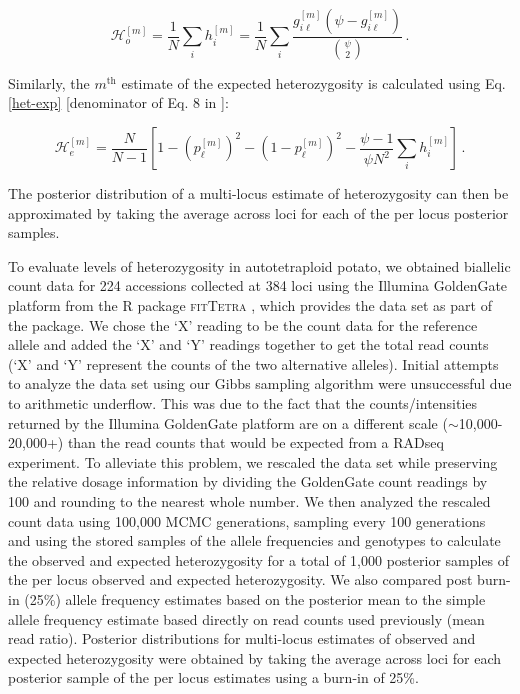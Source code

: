 \documentclass[11pt,english,letterpaper,oneside]{article}
\begin{document}
\begin{equation}\label{het-obs}
\mathcal{H}^{[m]}_o = \frac{1}{N} \sum_i h_{i}^{[m]} = \frac{1}{N} \sum_i \frac{g_{i\ell}^{[m]}(\psi-g_{i\ell}^{[m]})}{\binom{\psi}{2}}\, .
\end{equation}

\noindent Similarly, the $m^\text{th}$ estimate of the expected heterozygosity is calculated using Eq. \ref{het-exp} [denominator of Eq. 8 in \cite{hardy2015autopolyploids}]:

\begin{equation}\label{het-exp}
\mathcal{H}^{[m]}_e = \frac{N}{N-1} \left[1 - (p_{\ell}^{[m]})^2 - (1-p_{\ell}^{[m]})^2 - \frac{\psi-1}{\psi N^2}\sum_i h_{i}^{[m]}\right]\,.
\end{equation}

\noindent The posterior distribution of a multi-locus estimate of heterozygosity can then be approximated by taking the average across loci for each of the per locus posterior samples.
\medskip

To evaluate levels of heterozygosity in autotetraploid potato, we obtained biallelic count data for 224 accessions collected at 384 loci using the Illumina GoldenGate platform from the R package \textsc{fitTetra} \citep{voorrips2011fitTetra}, which provides the data set as part of the package. We chose the `X' reading to be the count data for the reference allele and added the `X' and `Y' readings together to get the total read counts (`X' and `Y' represent the counts of the two alternative alleles). Initial attempts to analyze the data set using our Gibbs sampling algorithm were unsuccessful due to arithmetic underflow. This was due to the fact that the counts/intensities returned by the Illumina GoldenGate platform are on a different scale ($\sim$10,000-20,000+) than the read counts that would be expected from a RADseq experiment. To alleviate this problem, we rescaled the data set while preserving the relative dosage information by dividing the GoldenGate count readings by 100 and rounding to the nearest whole number. We then analyzed the rescaled count data using 100,000 MCMC generations, sampling every 100 generations and using the stored samples of the allele frequencies and genotypes to calculate the observed and expected heterozygosity for a total of 1,000 posterior samples of the per locus observed and expected heterozygosity. We also compared post burn-in (25\%) allele frequency estimates based on the posterior mean to the simple allele frequency estimate based directly on read counts used previously (mean read ratio). Posterior distributions for multi-locus estimates of observed and expected heterozygosity were obtained by taking the average across loci for each posterior sample of the per locus estimates using a burn-in of 25\%.
\medskip
\end{document}

